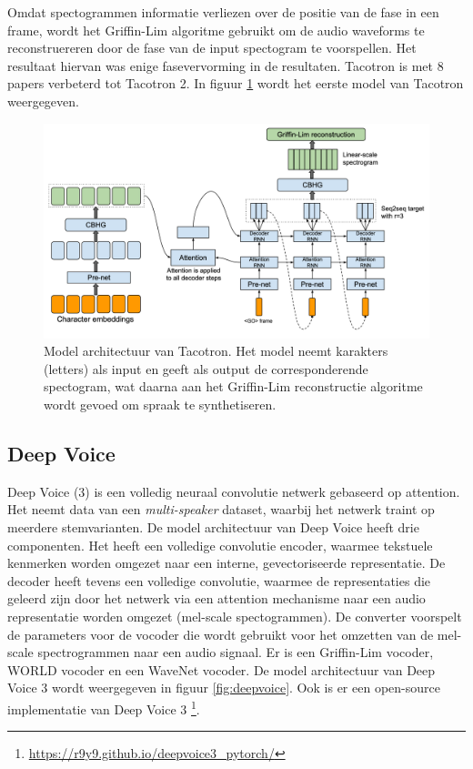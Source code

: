 Omdat spectogrammen informatie verliezen over de positie van de fase in een frame, wordt het Griffin-Lim algoritme gebruikt om de audio waveforms te reconstruereren door de fase van de input spectogram te voorspellen. Het resultaat hiervan was enige fasevervorming in de resultaten. Tacotron is met 8 papers verbeterd tot Tacotron 2. In figuur \ref{fig:tacotron} wordt het eerste model van Tacotron weergegeven.

\begin{figure}[H]
    \centering
    \includegraphics[width=\textwidth]{figures/tacotron.png}
    \caption{Model architectuur van Tacotron. Het model neemt karakters (letters) als input en geeft als output de corresponderende spectogram, wat daarna aan het Griffin-Lim reconstructie algoritme wordt gevoed om spraak te synthetiseren.}
    \label{fig:tacotron}
\end{figure}


\subsection{Deep Voice}
Deep Voice (3) is een volledig neuraal convolutie netwerk gebaseerd op attention\cite{Arik2017DeepVR}. Het neemt data van een \textit{multi-speaker} dataset, waarbij het netwerk traint op meerdere stemvarianten. De model architectuur van Deep Voice heeft drie componenten. Het heeft een volledige convolutie encoder, waarmee tekstuele kenmerken worden omgezet naar een interne, gevectoriseerde representatie. De decoder heeft tevens een volledige convolutie, waarmee de representaties die geleerd zijn door het netwerk via een attention mechanisme naar een audio representatie worden omgezet (mel-scale spectogrammen). De converter voorspelt de parameters voor de vocoder die wordt gebruikt voor het omzetten van de mel-scale spectrogrammen naar een audio signaal. Er is een Griffin-Lim vocoder, WORLD vocoder en een WaveNet vocoder. De model architectuur van Deep Voice 3 wordt weergegeven in figuur \ref{fig:deepvoice}. Ook is er een open-source implementatie van Deep Voice 3 \footnote{\url{https://r9y9.github.io/deepvoice3_pytorch/}}. 

